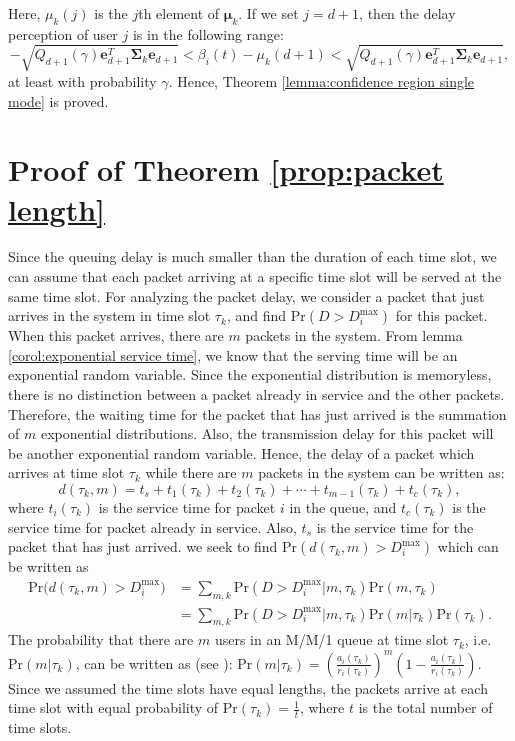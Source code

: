 \documentclass[journal,draftclsnofoot,onecolumn,12pt]{IEEEtran}%
\newcommand{\mub}{\boldsymbol{\mu}}
\newcommand{\Sigmab}{\boldsymbol{\Sigma}}
\begin{document}
	Here, $\mu_k(j)$ is the $j$th element of $\mub_k$. If we set $j=d+1$, then the delay perception of user $j$ is in the following range:
	\begin{equation}
	-\sqrt{Q_{d+1}(\gamma) \boldsymbol{e}_{d+1}^T\Sigmab_k \boldsymbol{e}_{d+1}}<	\beta_i(t)-\mu_k(d+1)<\sqrt{Q_{d+1}(\gamma) \boldsymbol{e}_{d+1}^T\Sigmab_k \boldsymbol{e}_{d+1}},
	\end{equation}
	at least with probability $\gamma$. Hence, Theorem \ref{lemma:confidence region single mode} is proved. 
    \section{Proof of Theorem \ref{prop:packet length}}
		Since the queuing delay is much smaller than the duration of each time slot, we can assume that each packet arriving at a specific time slot will be served at the same time slot. For analyzing the packet delay, we consider a packet that just arrives in the system in time slot $\tau_k$, and find  $\text{Pr}(D>D_i^{\max})$ for this packet. When this packet arrives, there are $m$ packets in the system. From lemma \ref{corol:exponential service time}, we know that the serving time will be an exponential random variable. Since the exponential distribution is memoryless, there is no distinction between a packet already in service and the other packets. Therefore, the waiting time for the packet that has just arrived is the summation of $m$ exponential distributions. Also, the transmission delay for this packet will be another exponential random variable. Hence, the delay of a packet which arrives at time slot $\tau_k$ while there are $m$ packets in the system can be written as:
		\begin{equation}
		d(\tau_k,m)=t_s+t_1(\tau_k)+t_2(\tau_k)+\cdots+t_{m-1}(\tau_k)+t_c(\tau_k),
		\end{equation}
		where $t_i(\tau_k)$ is the service time for packet $i$ in the queue, and $t_c(\tau_k)$ is the service time for packet already in service. Also, $t_s$ is the service time for the packet that has just arrived.
		we seek to find $\text{Pr}(d(\tau_k,m)>D_i^\textrm{max})$ which can be written as
		\begin{align}
		\text{Pr}\big(d(\tau_k,m)>D_i^\textrm{max}\big)&=\sum_{m,k} \text{Pr}(D>D_i^{\textrm{max}}|m,\tau_k)\text{Pr}(m,\tau_k)\nonumber\\
		&=\sum_{m,k} \text{Pr}(D>D_i^{\textrm{max}}|m,\tau_k)\text{Pr}(m|\tau_k) \text{Pr}(\tau_k).
		\end{align}
		The probability that there are $m$ users in an M/M/1 queue at time slot $\tau_k$, i.e.  $\text{Pr}(m|\tau_k)$, can be written as (see \cite{papoulis2002probability}):
		$
		\text{Pr}(m|\tau_k)=\left(\frac{a_i(\tau_k)}{r_i(\tau_k)}\right)^m \left(1-\frac{a_i(\tau_k)}{r_i(\tau_k)}\right).
	$
		Since we assumed the time slots have equal lengths, the packets arrive at each time slot with equal probability of $\text{Pr}(\tau_k)=\frac{1}{t}$, where $t$ is the total number of time slots.
		
\end{document}
